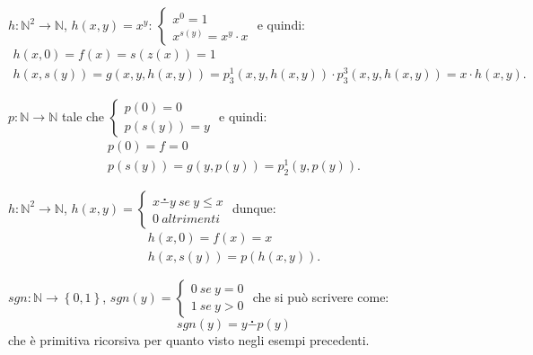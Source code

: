 %
%
\begin{esempio} $h:\mathbb{N}^2 \to \mathbb{N}$,
$h(x,y)=x^y$:
$\left\{ \begin{array}{ll}
	x^0=1\\
	x^{s(y)} = x^y \cdot x
\end{array}\right.$ e quindi: \newline
$$\begin{array}{ll}
	h(x,0)=f(x)=s(z(x))=1\\
	h(x,s(y))=g(x,y,h(x,y))= p_3^1(x,y,h(x,y)) \cdot p_3^3(x,y,h(x,y)) =
x\cdot h(x,y).
	\end{array}$$\newline
\end{esempio}
%
%
\begin{esempio}[predecessore] $p:\mathbb{N} \to \mathbb{N}$ tale che
$\left\{ \begin{array}{ll}
	p(0)=0\\
	p(s(y)) = y
\end{array}\right.$ e quindi: \newline
$$\begin{array}{ll}
	p(0)=f=0\\
	p(s(y))=g(y,p(y))= p_2^1(y,p(y)).
	\end{array}$$\newline
\end{esempio}
%
%
\begin{esempio}[sottrazione] $h:\mathbb{N}^2 \to \mathbb{N}$,
$ h(x,y) = \left\{ \begin{array}{ll}
	x \stackrel{\centerdot}{-} y \ se \ y \leq x\\
	0 \ altrimenti
\end{array}\right.$ dunque: \newline
$$\begin{array}{ll}
	h(x,0)=f(x)=x\\
	h(x,s(y))=p(h(x,y)).
	\end{array}$$\newline
\end{esempio}
%
%
\begin{esempio}[segno] $sgn:\mathbb{N} \to \left\{0,1\right\}$,
$ sgn(y) = \left\{ \begin{array}{ll}
	0 \ se \ y = 0\\
	1 \ se \ y > 0
\end{array}\right.$ che si pu\`o scrivere come:
 \[ sgn(y) = y \stackrel{\centerdot}{-} p(y) \]
che \`e primitiva ricorsiva per quanto visto negli esempi precedenti.
\end{esempio}
